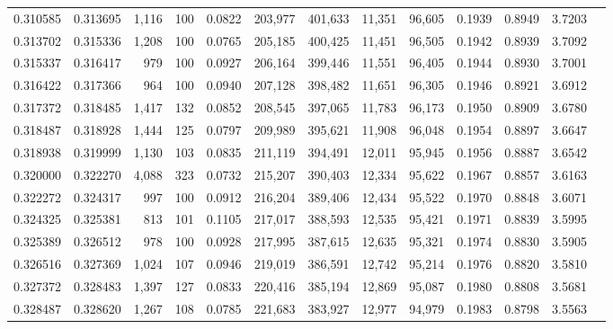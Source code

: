 \begin{tabular}{rrrrrrrrrrrrr}
0.310585 & 0.313695 & 1,116 & 100 &                                     0.0822 & 203,977 & 401,633 &  11,351 &  96,605 & 0.1939 & 0.8949 & 3.7203 \\
0.313702 & 0.315336 & 1,208 & 100 &                                     0.0765 & 205,185 & 400,425 &  11,451 &  96,505 & 0.1942 & 0.8939 & 3.7092 \\
0.315337 & 0.316417 &   979 & 100 &                                     0.0927 & 206,164 & 399,446 &  11,551 &  96,405 & 0.1944 & 0.8930 & 3.7001 \\
0.316422 & 0.317366 &   964 & 100 &                                     0.0940 & 207,128 & 398,482 &  11,651 &  96,305 & 0.1946 & 0.8921 & 3.6912 \\
0.317372 & 0.318485 & 1,417 & 132 &                                     0.0852 & 208,545 & 397,065 &  11,783 &  96,173 & 0.1950 & 0.8909 & 3.6780 \\
0.318487 & 0.318928 & 1,444 & 125 &                                     0.0797 & 209,989 & 395,621 &  11,908 &  96,048 & 0.1954 & 0.8897 & 3.6647 \\
0.318938 & 0.319999 & 1,130 & 103 &                                     0.0835 & 211,119 & 394,491 &  12,011 &  95,945 & 0.1956 & 0.8887 & 3.6542 \\
0.320000 & 0.322270 & 4,088 & 323 &                                     0.0732 & 215,207 & 390,403 &  12,334 &  95,622 & 0.1967 & 0.8857 & 3.6163 \\
0.322272 & 0.324317 &   997 & 100 &                                     0.0912 & 216,204 & 389,406 &  12,434 &  95,522 & 0.1970 & 0.8848 & 3.6071 \\
0.324325 & 0.325381 &   813 & 101 &                                     0.1105 & 217,017 & 388,593 &  12,535 &  95,421 & 0.1971 & 0.8839 & 3.5995 \\
0.325389 & 0.326512 &   978 & 100 &                                     0.0928 & 217,995 & 387,615 &  12,635 &  95,321 & 0.1974 & 0.8830 & 3.5905 \\
0.326516 & 0.327369 & 1,024 & 107 &                                     0.0946 & 219,019 & 386,591 &  12,742 &  95,214 & 0.1976 & 0.8820 & 3.5810 \\
0.327372 & 0.328483 & 1,397 & 127 &                                     0.0833 & 220,416 & 385,194 &  12,869 &  95,087 & 0.1980 & 0.8808 & 3.5681 \\
0.328487 & 0.328620 & 1,267 & 108 &                                     0.0785 & 221,683 & 383,927 &  12,977 &  94,979 & 0.1983 & 0.8798 & 3.5563 \\

\end{tabular}
